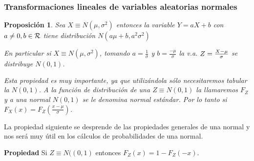 \documentclass[12pt]{report}
\newtheorem{proposition}[definition]{Proposici\'on}
\begin{document}
\subsubsection{Transformaciones lineales de variables aleatorias normales}

\begin{proposition} Sea $X\equiv N(\mu,\sigma^2)$  entonces la variable $Y=a X+b$ con
$a\not=0,b\in\cal{R}$ tiene distribución $N(a\mu+b, a^2 \sigma^2)$

En particular si  $X\equiv N(\mu,\sigma^2)$, tomando $a=\frac{1}{\sigma}$ y $b=
\frac{-\mu}{\sigma}$ la v.a. $Z={{X-\mu}\over {\sigma}}$ se distribuye $N(0,1)$.

Esta propiedad es muy importante, ya que utilizándola sólo necesitaremos tabular la
$N(0,1)$. A la función de distribución de una $Z\equiv N(0,1)$ la llamaremos $F_Z$  y a una
normal $N(0,1)$  se le denomina normal estándar. Por lo tanto si
$F_X(x)=F_Z(\frac{x-\mu}{\sigma})$.
\end{proposition}

La propiedad siguiente se desprende de las propiedades generales de una normal y nos será
muy útil en los cálculos de probabilidades de una normal.

\textbf{Propiedad} Si $Z\equiv N((0,1)$ entonces $F_{Z}(x)=1-F_{Z}(-x)$.
\end{document}
